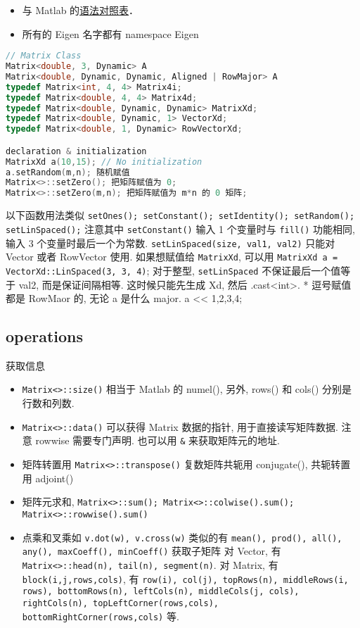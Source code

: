 
\begin{itemize}
\item 与 Matlab 的\href{https://eigen.tuxfamily.org/dox/AsciiQuickReference.txt}{语法对照表}．
\item 所有的 Eigen 名字都有 namespace Eigen
\end{itemize}

\begin{lstlisting}[language=cpp]
// Matrix Class
Matrix<double, 3, Dynamic> A
Matrix<double, Dynamic, Dynamic, Aligned | RowMajor> A
typedef Matrix<int, 4, 4> Matrix4i;
typedef Matrix<double, 4, 4> Matrix4d;
typedef Matrix<double, Dynamic, Dynamic> MatrixXd;
typedef Matrix<double, Dynamic, 1> VectorXd;
typedef Matrix<double, 1, Dynamic> RowVectorXd;

declaration & initialization
MatrixXd a(10,15); // No initialization
a.setRandom(m,n); 随机赋值
Matrix<>::setZero(); 把矩阵赋值为 0;
Matrix<>::setZero(m,n); 把矩阵赋值为 m*n 的 0 矩阵;
\end{lstlisting}

以下函数用法类似
\verb|setOnes(); setConstant(); setIdentity(); setRandom(); setLinSpaced();|
注意其中 \verb|setConstant()| 输入 1 个变量时与 \verb|fill()| 功能相同, 输入 3 个变量时最后一个为常数. \verb|setLinSpaced(size, val1, val2)| 只能对 Vector 或者 RowVector 使用. 如果想赋值给 \verb|MatrixXd|, 可以用 \verb|MatrixXd a = VectorXd::LinSpaced(3, 3, 4)|; 对于整型, \verb|setLinSpaced| 不保证最后一个值等于 val2, 而是保证间隔相等. 这时候只能先生成 Xd, 然后 .cast<int>.
* 逗号赋值都是 RowMaor 的, 无论 a 是什么 major.
a << 1,2,3,4;

\subsection{operations}
获取信息
\begin{itemize}
\item \verb|Matrix<>::size()| 相当于 Matlab 的 numel(), 另外, rows() 和 cols() 分别是行数和列数.
\item \verb|Matrix<>::data()| 可以获得 Matrix 数据的指针, 用于直接读写矩阵数据. 注意 rowwise 需要专门声明. 也可以用 \verb|&| 来获取矩阵元的地址.
\item 矩阵转置用 \verb|Matrix<>::transpose()| 复数矩阵共轭用 conjugate(), 共轭转置用 adjoint()
\item 矩阵元求和, \verb|Matrix<>::sum(); Matrix<>::colwise().sum(); Matrix<>::rowwise().sum()|
\item 点乘和叉乘如 \verb|v.dot(w), v.cross(w)|
类似的有 \verb|mean(), prod(), all(), any(), maxCoeff(), minCoeff()|
获取子矩阵
对 Vector, 有 \verb|Matrix<>::head(n), tail(n), segment(n)|. 对 Matrix, 有 \verb|block(i,j,rows,cols)|, 有 \verb|row(i), col(j), topRows(n), middleRows(i, rows), bottomRows(n), leftCols(n), middleCols(j, cols), rightCols(n), topLeftCorner(rows,cols), bottomRightCorner(rows,cols)| 等.
\end{itemize}


